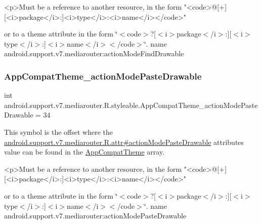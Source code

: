 \begin{DoxyVerb}      <p>Must be a reference to another resource, in the form "<code>@[+][<i>package</i>:]<i>type</i>:<i>name</i></code>"
\end{DoxyVerb}
 or to a theme attribute in the form \char`\"{}$<$code$>$?\mbox{[}$<$i$>$package$<$/i$>$\+:\mbox{]}\mbox{[}$<$i$>$type$<$/i$>$\+:\mbox{]}$<$i$>$name$<$/i$>$$<$/code$>$\char`\"{}.  name android.\+support.\+v7.\+mediarouter\+:action\+Mode\+Find\+Drawable \mbox{\label{classandroid_1_1support_1_1v7_1_1mediarouter_1_1R_1_1styleable_a1c9dba2509b8423490c34fd739e56e38}} 
\subsubsection{\texorpdfstring{App\+Compat\+Theme\+\_\+action\+Mode\+Paste\+Drawable}{AppCompatTheme\_actionModePasteDrawable}}
{\footnotesize\ttfamily int android.\+support.\+v7.\+mediarouter.\+R.\+styleable.\+App\+Compat\+Theme\+\_\+action\+Mode\+Paste\+Drawable = 34\hspace{0.3cm}{\ttfamily [static]}}

This symbol is the offset where the \hyperlink{classandroid_1_1support_1_1v7_1_1mediarouter_1_1R_1_1attr_ae3e83e89932fabdb6d38e932119b85c8}{android.\+support.\+v7.\+mediarouter.\+R.\+attr\#action\+Mode\+Paste\+Drawable} attribute\textquotesingle{}s value can be found in the \hyperlink{classandroid_1_1support_1_1v7_1_1mediarouter_1_1R_1_1styleable_a4e3d3900c75d49aeb2f283cac00214d6}{App\+Compat\+Theme} array.

\begin{DoxyVerb}      <p>Must be a reference to another resource, in the form "<code>@[+][<i>package</i>:]<i>type</i>:<i>name</i></code>"
\end{DoxyVerb}
 or to a theme attribute in the form \char`\"{}$<$code$>$?\mbox{[}$<$i$>$package$<$/i$>$\+:\mbox{]}\mbox{[}$<$i$>$type$<$/i$>$\+:\mbox{]}$<$i$>$name$<$/i$>$$<$/code$>$\char`\"{}.  name android.\+support.\+v7.\+mediarouter\+:action\+Mode\+Paste\+Drawable \mbox{\label{classandroid_1_1support_1_1v7_1_1mediarouter_1_1R_1_1styleable_a5f3bae33936a9476e7e6a9dab290157f}} 
